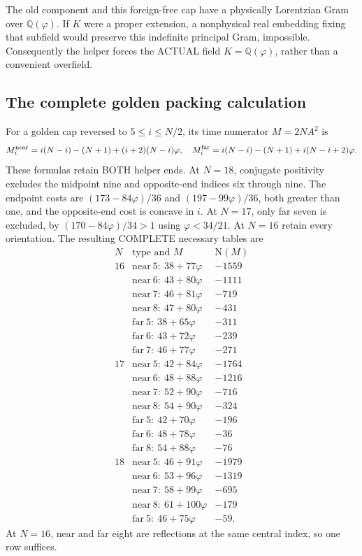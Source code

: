 The old component and this foreign-free cap have a physically
Lorentzian Gram over \(\mathbb Q(\varphi)\).
If \(K\) were a proper extension, a nonphysical real embedding
fixing that subfield would preserve this indefinite principal
Gram, impossible.
Consequently the helper forces the ACTUAL field
\(K=\mathbb Q(\varphi)\), rather than a convenient overfield.

\subsection{The complete golden packing calculation}
\label{app:arithgoldenpacking}

For a golden cap reversed to \(5\le i\le N/2\), its time
numerator \(M=2NA^2\) is
\[
 M_i^{\rm near}=i(N-i)-(N+1)+(i+2)(N-i)\varphi,\quad
 M_i^{\rm far}=i(N-i)-(N+1)+i(N-i+2)\varphi .
\]
These formulas retain BOTH helper ends.
At \(N=18\), conjugate positivity excludes the midpoint nine
and opposite-end indices six through nine.
The endpoint costs are \((173-84\varphi)/36\) and
\((197-99\varphi)/36\), both greater than one, and the
opposite-end cost is concave in \(i\).
At \(N=17\), only far seven is excluded, by
\((170-84\varphi)/34>1\) using \(\varphi<34/21\).
At \(N=16\) retain every orientation.
The resulting COMPLETE necessary tables are
\[
\begin{array}{c|c|r}
 N&\text{type and }M&\mathrm N(M)\\ \hline
16&\mathrm{near}\ 5:\ 38+77\varphi&-1559\\
 &\mathrm{near}\ 6:\ 43+80\varphi&-1111\\
 &\mathrm{near}\ 7:\ 46+81\varphi&-719\\
 &\mathrm{near}\ 8:\ 47+80\varphi&-431\\
 &\mathrm{far}\ 5:\ 38+65\varphi&-311\\
 &\mathrm{far}\ 6:\ 43+72\varphi&-239\\
 &\mathrm{far}\ 7:\ 46+77\varphi&-271\\ \hline
17&\mathrm{near}\ 5:\ 42+84\varphi&-1764\\
 &\mathrm{near}\ 6:\ 48+88\varphi&-1216\\
 &\mathrm{near}\ 7:\ 52+90\varphi&-716\\
 &\mathrm{near}\ 8:\ 54+90\varphi&-324\\
 &\mathrm{far}\ 5:\ 42+70\varphi&-196\\
 &\mathrm{far}\ 6:\ 48+78\varphi&-36\\
 &\mathrm{far}\ 8:\ 54+88\varphi&-76\\ \hline
18&\mathrm{near}\ 5:\ 46+91\varphi&-1979\\
 &\mathrm{near}\ 6:\ 53+96\varphi&-1319\\
 &\mathrm{near}\ 7:\ 58+99\varphi&-695\\
 &\mathrm{near}\ 8:\ 61+100\varphi&-179\\
 &\mathrm{far}\ 5:\ 46+75\varphi&-59 .
\end{array}
\]
At \(N=16\), near and far eight are reflections at the same
central index, so one row suffices.

